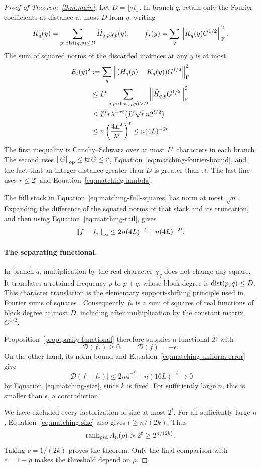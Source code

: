 \begin{proof}[Proof of Theorem~\ref{thm:main}]
Let $D=\lfloor\tau t\rfloor$.  In branch $q$, retain only the
Fourier coefficients at distance at most $D$ from $q$, writing
\[
 K_q(y)=\sum_{p:\,\operatorname{dist}(q,p)\le D}\widehat H_{q,p}\chi_p(y),
 \qquad
 f_*(y)=\sum_q\left\lVert K_q(y)G^{1/2}\right\rVert_{\mathrm F}^2.
\]
The sum of squared norms of the discarded matrices at any $y$ is
at most
\begin{align}
 E_t(y)^2
 &:=\sum_q\left\lVert(H_q(y)-K_q(y))G^{1/2}\right\rVert_{\mathrm F}^2\notag\\
 &\le L^t\sum_{q,p:\,\operatorname{dist}(q,p)>D}
                    \left\lVert\widehat H_{q,p}G^{1/2}\right\rVert_{\mathrm F}^2\notag\\
 &\le L^t r\lambda^{-\tau t}
              \bigl(L^t\sqrt r\,n2^{t/2}\bigr)\notag\\
 &\le n\left(\frac{4L^2}{\lambda^\tau}\right)^t
 \le n(4L)^{-2t}.
 \label{eq:matching-tail}
\end{align}
The first inequality is Cauchy--Schwarz over at most $L^t$
characters in each branch.  The second uses
$\left\lVert G\right\rVert_{\mathrm{op}}\le\operatorname{tr} G\le r$, Equation~\eqref{eq:matching-fourier-bound},
and the fact that an integer distance greater than $D$ is greater
than $\tau t$.  The last line uses $r\le2^t$ and
Equation~\eqref{eq:matching-lambda}.

The full stack in Equation~\eqref{eq:matching-full-squares} has norm
at most $\sqrt n$.  Expanding the difference of the squared norms
of that stack and its truncation, and then using
Equation~\eqref{eq:matching-tail}, gives
\begin{equation}\label{eq:matching-uniform-error}
 \left\lVert f-f_*\right\rVert_\infty
 \le 2n(4L)^{-t}+n(4L)^{-2t}.
\end{equation}

\paragraph{The separating functional.}
In branch $q$, multiplication by the real character $\chi_q$
does not change any square.  It translates a retained frequency
$p$ to $p+q$, whose block degree is $\operatorname{dist}(p,q)\le D$.
This character translation is the elementary support-shifting
principle used in Fourier sums of squares
\cite{fsp-sparse}.
Consequently $f_*$ is a sum of squares of real functions of block
degree at most $D$, including after multiplication by the constant
matrix $G^{1/2}$.

Proposition~\ref{prop:parity-functional} therefore supplies a
functional $\mathcal D$ with
\[
 \mathcal D(f_*)\ge0,\qquad \mathcal D(f)=-\epsilon.
\]
On the other hand, its norm bound and
Equation~\eqref{eq:matching-uniform-error} give
\[
 |\mathcal D(f-f_*)|
 \le 2n4^{-t}+n(16L)^{-t}\longrightarrow0
\]
by Equation~\eqref{eq:matching-size}, since $k$ is fixed.
For sufficiently large $n$, this is smaller than $\epsilon$,
a contradiction.

We have excluded every factorization of size at most $2^t$.
For all sufficiently large $n$, Equation~\eqref{eq:matching-size}
also gives $t\ge n/(2k)$.  Thus
\[
 \operatorname{rank_{psd}} A_n(\rho)>2^t\ge2^{n/(2k)}.
\]
Taking $c=1/(2k)$ proves the theorem.  Only the final comparison
with $\epsilon=1-\rho$ makes the threshold depend on $\rho$.
\end{proof}
